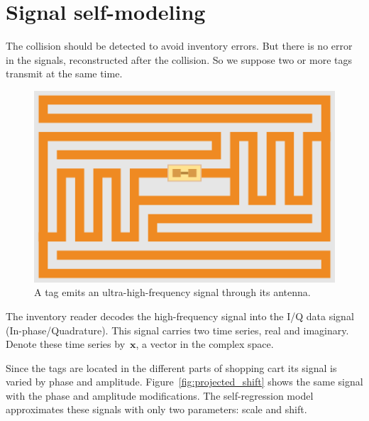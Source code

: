 \documentclass[12pt]{article}
\begin{document}
\section{Signal self-modeling}
The collision should be detected to avoid inventory errors. But there is no error in the signals, reconstructed after the collision. So we suppose two or more tags transmit at the same time. 
\begin{figure}  %
\centering
\includegraphics[width=\linewidth]{EPC-RFID-TAG.svg.png}
\caption{A tag emits an ultra-high-frequency signal through its antenna.}
\label{fig:antenna}%
\end{figure}
The inventory reader decodes the high-frequency signal into the I/Q data signal (In-phase/Quadrature). This signal carries two time series, real and imaginary. Denote these time series by~$\mathbf{x}$, a vector in the complex space. 

Since the tags are located in the different parts of shopping cart its signal is varied by phase and amplitude. Figure~\ref{fig:projected_shift} shows the same signal with the phase and amplitude modifications. The self-regression model approximates these signals with only two parameters: scale and shift.
\end{document}
